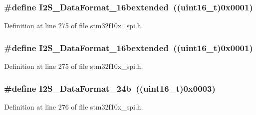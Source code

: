 \subsubsection[{\texorpdfstring{I2\+S\+\_\+\+Data\+Format\+\_\+16bextended}{I2S_DataFormat_16bextended}}]{\setlength{\rightskip}{0pt plus 5cm}\#define I2\+S\+\_\+\+Data\+Format\+\_\+16bextended~(({\bf uint16\+\_\+t})0x0001)}\hypertarget{group___i2_s___data___format_gae44b9704c9e393d5abec9bf4fcfe1116}{}\label{group___i2_s___data___format_gae44b9704c9e393d5abec9bf4fcfe1116}


Definition at line 275 of file stm32f10x\+\_\+spi.\+h.

\subsubsection[{\texorpdfstring{I2\+S\+\_\+\+Data\+Format\+\_\+16bextended}{I2S_DataFormat_16bextended}}]{\setlength{\rightskip}{0pt plus 5cm}\#define I2\+S\+\_\+\+Data\+Format\+\_\+16bextended~(({\bf uint16\+\_\+t})0x0001)}\hypertarget{group___i2_s___data___format_gae44b9704c9e393d5abec9bf4fcfe1116}{}\label{group___i2_s___data___format_gae44b9704c9e393d5abec9bf4fcfe1116}


Definition at line 275 of file stm32f10x\+\_\+spi.\+h.

\subsubsection[{\texorpdfstring{I2\+S\+\_\+\+Data\+Format\+\_\+24b}{I2S_DataFormat_24b}}]{\setlength{\rightskip}{0pt plus 5cm}\#define I2\+S\+\_\+\+Data\+Format\+\_\+24b~(({\bf uint16\+\_\+t})0x0003)}\hypertarget{group___i2_s___data___format_ga5a959486671cf00c5a734f1df205581b}{}\label{group___i2_s___data___format_ga5a959486671cf00c5a734f1df205581b}


Definition at line 276 of file stm32f10x\+\_\+spi.\+h.

